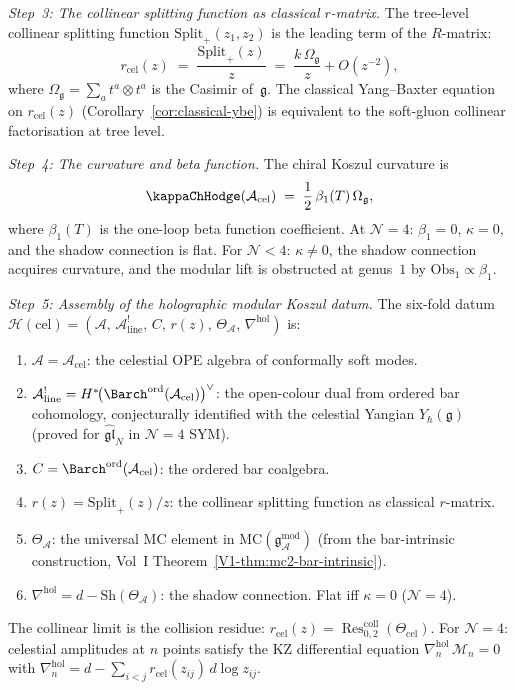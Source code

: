 \begin{construction}
\emph{Step~3: The collinear splitting function as classical
$r$-matrix.}
The tree-level collinear splitting function
$\mathrm{Split}_{+}(z_1,z_2)$ is the leading term
of the $R$-matrix:
\[
r_{\mathrm{cel}}(z)
\;=\;
\frac{\mathrm{Split}_{+}(z)}{z}
\;=\;
\frac{k\,\Omega_{\mathfrak{g}}}{z}+O(z^{-2}), %
\]
where $\Omega_{\mathfrak{g}}=\sum_a t^a\otimes t^a$ is the
Casimir of~$\mathfrak{g}$. The classical Yang--Baxter
equation on $r_{\mathrm{cel}}(z)$
(Corollary~\ref{cor:classical-ybe}) is equivalent to the
soft-gluon collinear factorisation at tree level.

\emph{Step~4: The curvature and beta function.}
The chiral Koszul curvature is
\[
\kappaChHodge(\mathcal{A}_{\mathrm{cel}})
\;=\;
\frac{1}{2}\,\beta_1(T)\,\Omega_{\mathfrak{g}},
\]
where $\beta_1(T)$ is the one-loop beta function
coefficient. At $\mathcal{N}=4$: $\beta_1=0$,
$\kappa=0$, and the shadow connection is flat. For
$\mathcal{N}<4$: $\kappa\neq 0$, the shadow connection
acquires curvature, and the modular lift is obstructed
at genus~$1$ by $\mathrm{Obs}_1\propto\beta_1$.

\emph{Step~5: Assembly of the holographic modular Koszul datum.}
The six-fold datum
$\mathcal{H}(\mathrm{cel})
=(\mathcal{A},\,\mathcal{A}^!_{\mathrm{line}},\,C,\,r(z),\,
\Theta_{\mathcal{A}},\,\nabla^{\mathrm{hol}})$
is:
\begin{enumerate}[label=\textup{(\roman*)}]
\item $\mathcal{A}=\mathcal{A}_{\mathrm{cel}}$: the celestial
 OPE algebra of conformally soft modes.
\item $\mathcal{A}^!_{\mathrm{line}}
 =H^*\!\bigl({\Barch}^{\mathrm{ord}}(\mathcal{A}_{\mathrm{cel}})\bigr)^\vee$:
 the open-colour dual from ordered bar cohomology, conjecturally
 identified with the celestial Yangian $Y_\hbar(\mathfrak{g})$
 \textup{(}proved for $\widehat{\mathfrak{gl}}_N$ in
 $\mathcal{N}=4$ SYM\textup{)}.
\item $C={\Barch}^{\mathrm{ord}}(\mathcal{A}_{\mathrm{cel}})$:
 the ordered bar coalgebra.
\item $r(z)=\mathrm{Split}_{+}(z)/z$: the collinear
 splitting function as classical $r$-matrix.
\item $\Theta_{\mathcal{A}}$: the universal MC element in
 $\mathrm{MC}(\mathfrak{g}^{\mathrm{mod}}_{\mathcal{A}})$
 (from the bar-intrinsic construction, Vol~I
 Theorem~\ref*{V1-thm:mc2-bar-intrinsic}).
\item $\nabla^{\mathrm{hol}}=d-\mathrm{Sh}(\Theta_{\mathcal{A}})$:
 the shadow connection. Flat iff $\kappa=0$
 ($\mathcal N=4$).
\end{enumerate}
The collinear limit is the collision residue:
$r_{\mathrm{cel}}(z)
=\operatorname{Res}^{\mathrm{coll}}_{0,2}
(\Theta_{\mathrm{cel}})$.
For $\mathcal{N}=4$: celestial amplitudes at $n$ points
satisfy the KZ differential equation
$\nabla^{\mathrm{hol}}_n\,\mathcal{M}_n=0$
with $\nabla^{\mathrm{hol}}_n
=d-\sum_{i<j}r_{\mathrm{cel}}(z_{ij})\,d\log z_{ij}$.
\end{construction}


